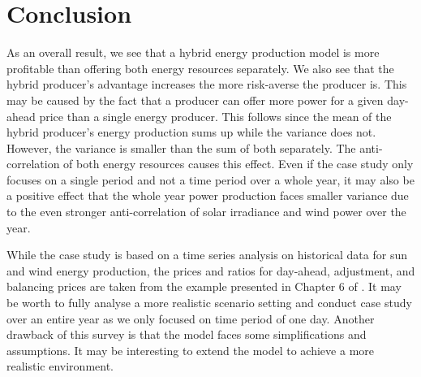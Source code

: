 \section{Conclusion}

As an overall result, we see that a hybrid energy production model is more profitable than offering both energy resources separately. We also see that the hybrid producer's advantage increases the more risk-averse the producer is. This may be caused by the fact that a producer can offer more power for a given day-ahead price than a single energy producer. This follows since the mean of the hybrid producer's energy production sums up while the variance does not. However, the variance is smaller than the sum of both separately. The anti-correlation of both energy resources causes this effect. 
Even if the case study only focuses on a single period and not a time period over a whole year, it may also be a positive effect that the whole year power production faces smaller variance due to the even stronger anti-correlation of solar irradiance and wind power over the year. 

While the case study is based on a time series analysis on historical data for sun and wind energy production, the prices and ratios for day-ahead, adjustment, and balancing prices are taken from the example presented in Chapter 6 of \cite{Conejo10} . It may be worth to fully analyse a more realistic scenario setting and conduct case study over an entire year as we only focused on time period of one day. Another drawback of this survey is that the model faces some simplifications and assumptions. It may be interesting to extend the model to achieve a more realistic environment. 